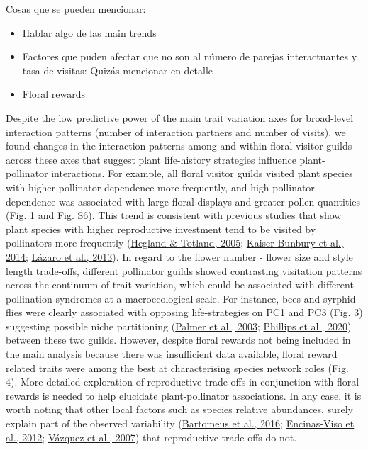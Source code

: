 \documentclass[
  12pt,
  a4paper,
]{article}
\begin{document}
Cosas que se pueden mencionar:

\begin{itemize}
\item
  Hablar algo de las main trends
\item
  Factores que puden afectar que no son al número de parejas interactuantes y tasa de visitas: Quizás mencionar en detalle
\item
  Floral rewards
\end{itemize}

Despite the low predictive power of the main trait variation axes for broad-level interaction patterns (number of interaction partners and number of visits), we found changes in the interaction patterns among and within floral visitor guilds across these axes that suggest plant life-history strategies influence plant-pollinator interactions. For example, all floral visitor guilds visited plant species with higher pollinator dependence more frequently, and high pollinator dependence was associated with large floral displays and greater pollen quantities (Fig. 1 and Fig. S6). This trend is consistent with previous studies that show plant species with higher reproductive investment tend to be visited by pollinators more frequently (\protect\hyperlink{ref-hegland2005}{Hegland \& Totland, 2005}; \protect\hyperlink{ref-kaiser2014}{Kaiser-Bunbury et al., 2014}; \protect\hyperlink{ref-lazaro2013}{Lázaro et al., 2013}). In regard to the flower number - flower size and style length trade-offs, different pollinator guilds showed contrasting visitation patterns across the continuum of trait variation, which could be associated with different pollination syndromes at a macroecological scale. For instance, bees and syrphid flies were clearly associated with opposing life-strategies on PC1 and PC3 (Fig. 3) suggesting possible niche partitioning (\protect\hyperlink{ref-palmer2003}{Palmer et al., 2003}; \protect\hyperlink{ref-phillips2020}{Phillips et al., 2020}) between these two guilds. However, despite floral rewards not being included in the main analysis because there was insufficient data available, floral reward related traits were among the best at characterising species network roles (Fig. 4). More detailed exploration of reproductive trade-offs in conjunction with floral rewards is needed to help elucidate plant-pollinator associations. In any case, it is worth noting that other local factors such as species relative abundances, surely explain part of the observed variability (\protect\hyperlink{ref-bartomeus2016}{Bartomeus et al., 2016}; \protect\hyperlink{ref-encinas2012}{Encinas-Viso et al., 2012}; \protect\hyperlink{ref-vazquez2007}{Vázquez et al., 2007}) that reproductive trade-offs do not.
\end{document}
